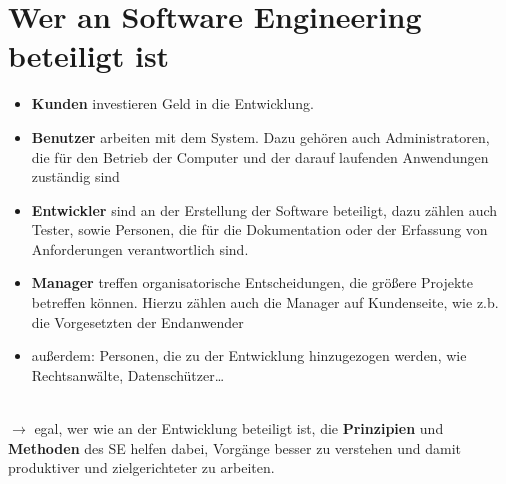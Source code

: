 \section{Wer an Software Engineering beteiligt ist}

\begin{itemize}
    \item \textbf{Kunden} investieren Geld in die Entwicklung.
    \item \textbf{Benutzer} arbeiten mit dem System.
    Dazu gehören auch Administratoren, die für den Betrieb der Computer und der darauf laufenden Anwendungen zuständig sind
    \item \textbf{Entwickler} sind an der Erstellung der Software beteiligt, dazu zählen auch Tester, sowie Personen, die für die Dokumentation oder der Erfassung von Anforderungen verantwortlich sind.
    \item \textbf{Manager} treffen organisatorische Entscheidungen, die größere Projekte betreffen können.
     Hierzu zählen auch die Manager auf Kundenseite, wie z.b. die Vorgesetzten der Endanwender
    \item außerdem: Personen, die zu der Entwicklung hinzugezogen werden, wie Rechtsanwälte, Datenschützer\ldots
\end{itemize}\\

\noindent
$\rightarrow$ egal, wer wie an der Entwicklung beteiligt ist, die \textbf{Prinzipien} und \textbf{Methoden} des SE helfen dabei, Vorgänge besser zu verstehen und damit produktiver und zielgerichteter zu arbeiten.

